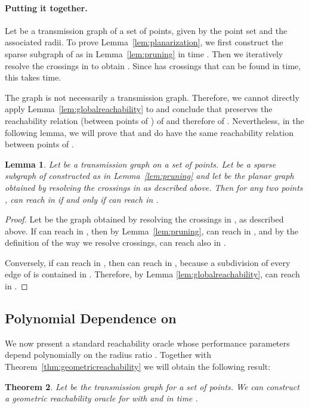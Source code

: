 \documentclass[11pt,a4paper]{paper}
\newtheorem{theorem}{Theorem}[section]
\newtheorem{lemma}[theorem]{Lemma}
\begin{document}
\paragraph*{Putting it together.}
Let  be a transmission graph of a set  of points, given 
by the point set  and the associated radii.
To prove Lemma~\ref{lem:planarization}, we first construct the sparse
subgraph  of  as in Lemma~\ref{lem:pruning} in time .
Then we iteratively resolve the crossings in  to obtain
.
Since  has  crossings that can be found in  time,
this takes  time.

The graph  is not necessarily a transmission graph. Therefore, we cannot 
directly apply Lemma~\ref{lem:globalreachability} to 
and conclude that  preserves the reachability relation
(between points of ) of  and therefore of
. Nevertheless, in the following lemma, we will
prove  that  and  do have the same reachability 
relation between points of .
\begin{lemma}
Let  be a transmission graph on a set  of points. Let  be a sparse subgraph of  constructed  as in Lemma~\ref{lem:pruning}
and let  be the planar graph obtained by resolving the crossings in  as described above.
Then for any two points  ,  can reach  in  if and only if 
can reach  in .
\end{lemma}
\begin{proof}
Let  be the graph obtained by resolving the crossings
in , as described above.  If  can reach  in , then by 
Lemma~\ref{lem:pruning},  can reach  in , and by the definition of
the way we resolve  crossings,  can reach  also in .

Conversely,
if  can reach 
in ,
then  can reach  in , because a subdivision of every edge
of  is contained in . Therefore,
by Lemma \ref{lem:globalreachability},  can reach  in .
\end{proof}


\subsection{Polynomial Dependence on }
\label{sec:psiconst}
We now present a standard reachability oracle whose performance parameters
depend polynomially on the radius ratio .
Together with Theorem~\ref{thm:geometricreachability} we will obtain the
following result:
\begin{theorem}
\label{thm:2doraclefixed}
Let  be the transmission graph for a set 
of  points.
We can construct a geometric reachability oracle for 
with  and  in
time .
\end{theorem}
\end{document}
